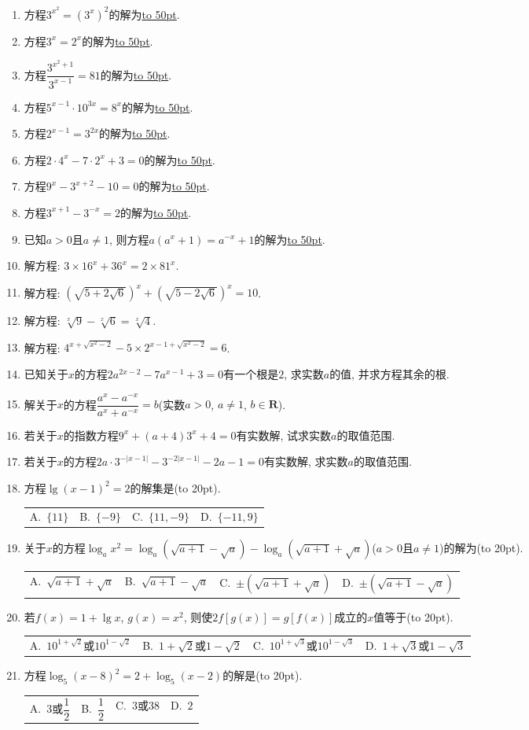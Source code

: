 \documentclass[10pt,a4paper]{article}
\newcommand{\blank}[1]{\underline{\hbox to #1pt{}}}
\newcommand{\bracket}[1]{(\hbox to #1pt{})}
\newcommand{\fourch}[4]{\par\begin{tabular}{p{.23\textwidth}p{.23\textwidth}p{.23\textwidth}p{.23\textwidth}}
A.~#1 &B.~#2& C.~#3& D.~#4
\end{tabular}}
\begin{document}
\begin{enumerate}[1.]
\fourch{$\{-2,-3\}$}{$\{2,-3\}$}{$\{2,3\}$}{$\{-2,3\}$}
\item 方程$3^{x^2}=(3^x)^2$的解为\blank{50}.
\item 方程$3^x=2^x$的解为\blank{50}.
\item 方程$\dfrac{3^{x^2+1}}{3^{x-1}}=81$的解为\blank{50}.
\item 方程$5^{x-1}\cdot 10^{3x}=8^x$的解为\blank{50}.
\item 方程$2^{x-1}=3^{2x}$的解为\blank{50}.
\item 方程$2\cdot 4^x-7\cdot 2^x+3=0$的解为\blank{50}.
\item 方程$9^x-3^{x+2}-10=0$的解为\blank{50}.
\item 方程$3^{x+1}-3^{-x}=2$的解为\blank{50}.
\item 已知$a>0$且$a\ne 1$, 则方程$a(a^x+1)=a^{-x}+1$的解为\blank{50}.
\item 解方程: $3\times 16^x+36^x=2\times 81^x$.
\item 解方程: $(\sqrt {5+2\sqrt 6})^x+(\sqrt {5-2\sqrt 6})^x=10$.
\item 解方程: $\sqrt[x]9-\sqrt[x]6=\sqrt[x]4$.
\item 解方程: $4^{x+\sqrt {x^2-2}}-5\times 2^{x-1+\sqrt {x^2-2}}=6$.
\item 已知关于$x$的方程$2a^{2x-2}-7a^{x-1}+3=0$有一个根是$2$, 求实数$a$的值, 并求方程其余的根.
\item 解关于$x$的方程$\dfrac{a^x-a^{-x}}{a^x+a^{-x}}=b$(实数$a>0$, $a\ne 1$, $b\in \mathbf{R}$).
\item 若关于$x$的指数方程$9^x+(a+4)3^x+4=0$有实数解, 试求实数$a$的取值范围.
\item 若关于$x$的方程$2a\cdot 3^{-|x-1|}-3^{-2|x-1|}-2a-1=0$有实数解, 求实数$a$的取值范围.
\item 方程$\lg (x-1)^2=2$的解集是\bracket{20}.
\fourch{$\{11\}$}{$\{-9\}$}{$\{11,-9\}$}{$\{-11,9\}$}
\item 关于$x$的方程$\log_ax^2=\log_a(\sqrt {a+1}-\sqrt a)-\log_a(\sqrt {a+1}+\sqrt a)$($a>0$且$a\ne 1$)的解为\bracket{20}.
\fourch{$\sqrt {a+1}+\sqrt a$}{$\sqrt {a+1}-\sqrt a$}{$\pm (\sqrt {a+1}+\sqrt a)$}{$\pm (\sqrt {a+1}-\sqrt a)$}
\item 若$f(x)=1+\lg x$, $g(x)=x^2$, 则使$2f[g(x)]=g[f(x)]$成立的$x$值等于\bracket{20}.
\fourch{$10^{1+\sqrt 2}$或$10^{1-\sqrt 2}$}{$1+\sqrt 2$或$1-\sqrt 2$}{$10^{1+\sqrt 3}$或$10^{1-\sqrt 3}$}{$1+\sqrt 3$或$1-\sqrt 3$}
\item 方程$\log_5(x-8)^2=2+\log_5(x-2)$的解是\bracket{20}.
\fourch{3或$\dfrac 12$}{$\dfrac 12$}{$3$或$38$}{$2$}

\end{enumerate}
\end{document}
